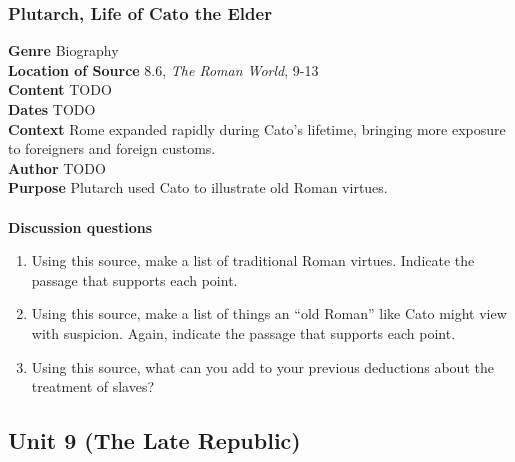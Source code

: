 \documentclass{article}
\begin{document}
\subsubsection*{Plutarch, Life of Cato the Elder}
\textbf{Genre}
Biography \\
\textbf{Location of Source}
8.6, \textit{The Roman World}, 9-13 \\
\textbf{Content}
TODO \\
\textbf{Dates}
TODO \\
\textbf{Context}
Rome expanded rapidly during Cato’s lifetime, bringing more exposure to foreigners and foreign customs. \\
\textbf{Author}
TODO \\
\textbf{Purpose}
Plutarch used Cato to illustrate old Roman virtues. \\
\\
\textbf{Discussion questions}
\begin{enumerate}
  \item Using this source, make a list of traditional Roman virtues. Indicate the passage that supports each point.
  \item Using this source, make a list of things an “old Roman” like Cato might view with suspicion. Again, indicate the passage that supports each point.
  \item Using this source, what can you add to your previous deductions about the treatment of slaves?
\end{enumerate}
\subsection*{Unit 9 (The Late Republic)}
\end{document}
